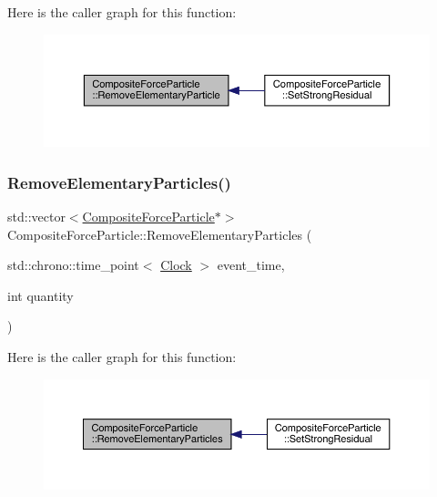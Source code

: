 Here is the caller graph for this function\+:\nopagebreak
\begin{figure}[H]
\begin{center}
\leavevmode
\includegraphics[width=350pt]{class_composite_force_particle_ab63c4a1d5734f1d13806cb9463075a40_icgraph}
\end{center}
\end{figure}
\mbox{\label{class_composite_force_particle_a032f7d935062f40c798841b2c2f81f98}} 
\subsubsection{\texorpdfstring{Remove\+Elementary\+Particles()}{RemoveElementaryParticles()}}
{\footnotesize\ttfamily std\+::vector$<$\hyperlink{class_composite_force_particle}{Composite\+Force\+Particle}$\ast$$>$ Composite\+Force\+Particle\+::\+Remove\+Elementary\+Particles (\begin{DoxyParamCaption}\item[{std\+::chrono\+::time\+\_\+point$<$ \hyperlink{universe_8h_a0ef8d951d1ca5ab3cfaf7ab4c7a6fd80}{Clock} $>$}]{event\+\_\+time,  }\item[{int}]{quantity }\end{DoxyParamCaption})}

Here is the caller graph for this function\+:\nopagebreak
\begin{figure}[H]
\begin{center}
\leavevmode
\includegraphics[width=350pt]{class_composite_force_particle_a032f7d935062f40c798841b2c2f81f98_icgraph}
\end{center}
\end{figure}
\mbox{\label{class_composite_force_particle_ab4767179e32f6d2b4b31941dd3c48b10}} 
